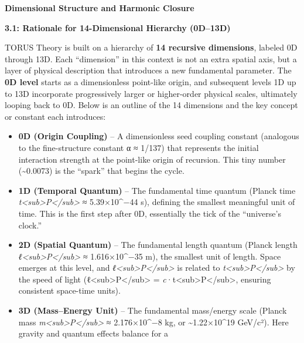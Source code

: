 \documentclass[
]{article}
\author{}
\date{}
\begin{document}
\textbf{Dimensional Structure and Harmonic Closure}

\textbf{3.1: Rationale for 14-Dimensional Hierarchy (0D--13D)}

TORUS Theory is built on a hierarchy of \textbf{14 recursive
dimensions}, labeled 0D through 13D. Each ``dimension'' in this context
is not an extra spatial axis, but a layer of physical description that
introduces a new fundamental parameter. The \textbf{0D level} starts as
a dimensionless point-like origin, and subsequent levels 1D up to 13D
incorporate progressively larger or higher-order physical scales,
ultimately looping back to 0D. Below is an outline of the 14 dimensions
and the key concept or constant each introduces:

\begin{itemize}
\item
  \textbf{0D (Origin Coupling)} -- A dimensionless seed coupling
  constant (analogous to the fine-structure constant α ≈ 1/137) that
  represents the initial interaction strength at the point-like origin
  of recursion\hspace{0pt}. This tiny number (\textasciitilde0.0073) is
  the ``spark'' that begins the cycle.
\item
  \textbf{1D (Temporal Quantum)} -- The fundamental time quantum (Planck
  time \emph{t\textless sub\textgreater P\textless/sub\textgreater{}} ≈
  5.39×10\^{}−44 s), defining the smallest meaningful unit of time. This
  is the first step after 0D, essentially the tick of the ``universe's
  clock.''
\item
  \textbf{2D (Spatial Quantum)} -- The fundamental length quantum
  (Planck length
  \emph{ℓ\textless sub\textgreater P\textless/sub\textgreater{}} ≈
  1.616×10\^{}−35 m), the smallest unit of length\hspace{0pt}. Space
  emerges at this level, and
  \emph{ℓ\textless sub\textgreater P\textless/sub\textgreater{}} is
  related to
  \emph{t\textless sub\textgreater P\textless/sub\textgreater{}} by the
  speed of light
  (ℓ\textless sub\textgreater P\textless/sub\textgreater{} =
  \emph{c}·t\textless sub\textgreater P\textless/sub\textgreater,
  ensuring consistent space-time units).
\item
  \textbf{3D (Mass--Energy Unit)} -- The fundamental mass/energy scale
  (Planck mass
  \emph{m\textless sub\textgreater P\textless/sub\textgreater{}} ≈
  2.176×10\^{}−8 kg, or \textasciitilde1.22×10\^{}19
  GeV/c²)\hspace{0pt}. Here gravity and quantum effects balance for a

\end{itemize}
\end{document}
